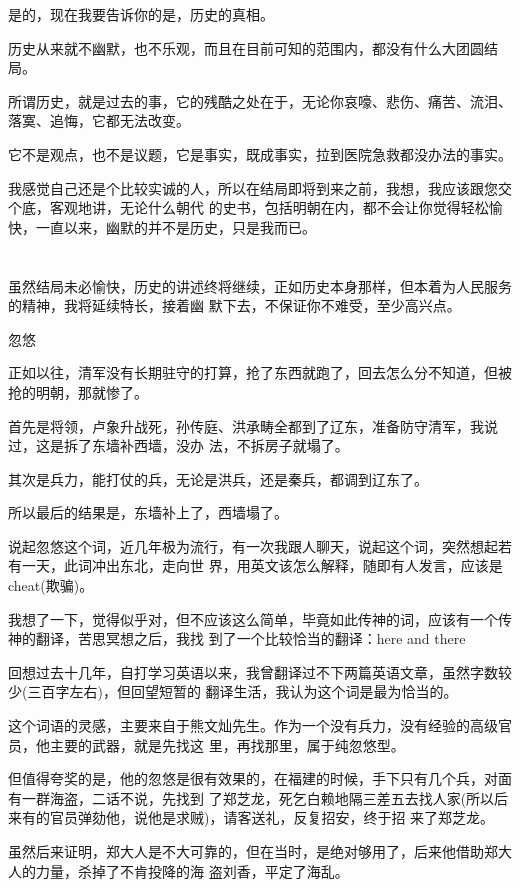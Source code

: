 \documentclass[11pt,a4paper,onecolumn]{article}
\begin{document}
是的，现在我要告诉你的是，历史的真相。

历史从来就不幽默，也不乐观，而且在目前可知的范围内，都没有什么大团圆结局。

所谓历史，就是过去的事，它的残酷之处在于，无论你哀嚎、悲伤、痛苦、流泪、落寞、追悔，它都无法改变。

它不是观点，也不是议题，它是事实，既成事实，拉到医院急救都没办法的事实。

我感觉自己还是个比较实诚的人，所以在结局即将到来之前，我想，我应该跟您交个底，客观地讲，无论什么朝代
的史书，包括明朝在内，都不会让你觉得轻松愉快，一直以来，幽默的并不是历史，只是我而已。

\section[\thesection]{}

虽然结局未必愉快，历史的讲述终将继续，正如历史本身那样，但本着为人民服务的精神，我将延续特长，接着幽
默下去，不保证你不难受，至少高兴点。

忽悠

正如以往，清军没有长期驻守的打算，抢了东西就跑了，回去怎么分不知道，但被抢的明朝，那就惨了。

首先是将领，卢象升战死，孙传庭、洪承畴全都到了辽东，准备防守清军，我说过，这是拆了东墙补西墙，没办
法，不拆房子就塌了。

其次是兵力，能打仗的兵，无论是洪兵，还是秦兵，都调到辽东了。

所以最后的结果是，东墙补上了，西墙塌了。

说起忽悠这个词，近几年极为流行，有一次我跟人聊天，说起这个词，突然想起若有一天，此词冲出东北，走向世
界，用英文该怎么解释，随即有人发言，应该是cheat(欺骗)。

我想了一下，觉得似乎对，但不应该这么简单，毕竟如此传神的词，应该有一个传神的翻译，苦思冥想之后，我找
到了一个比较恰当的翻译：here and there

回想过去十几年，自打学习英语以来，我曾翻译过不下两篇英语文章，虽然字数较少(三百字左右)，但回望短暂的
翻译生活，我认为这个词是最为恰当的。

这个词语的灵感，主要来自于熊文灿先生。作为一个没有兵力，没有经验的高级官员，他主要的武器，就是先找这
里，再找那里，属于纯忽悠型。

但值得夸奖的是，他的忽悠是很有效果的，在福建的时候，手下只有几个兵，对面有一群海盗，二话不说，先找到
了郑芝龙，死乞白赖地隔三差五去找人家(所以后来有的官员弹劾他，说他是求贼)，请客送礼，反复招安，终于招
来了郑芝龙。

虽然后来证明，郑大人是不大可靠的，但在当时，是绝对够用了，后来他借助郑大人的力量，杀掉了不肯投降的海
盗刘香，平定了海乱。
\end{document}

